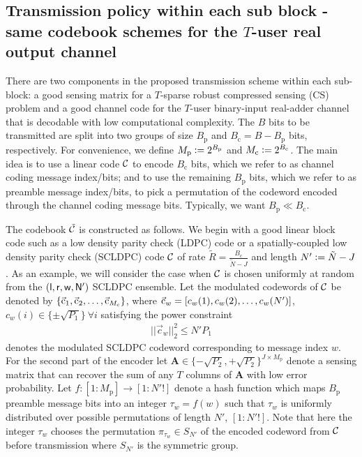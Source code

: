 \subsection{Transmission policy within each sub block - same codebook schemes for the $T$-user real output channel}
There are two components in the proposed transmission scheme within each sub-block: a good sensing matrix for a $T$-sparse robust compressed sensing (CS) problem and a good channel code for the $T$-user binary-input real-adder channel that is decodable with low computational complexity. The $B$ bits to be transmitted are split into two groups of size $B_{\mathrm{p}}$ and $B_{\mathrm{c}} = B-B_{\mathrm{p}}$ bits, respectively. For convenience, we define $M_{\mathrm{p}} \mathrel{\mathop:}= 2^{B_{\mathrm{p}}}$ and $M_{\mathrm{c}} \mathrel{\mathop:}= 2^{B_{\mathrm{c}}}$. The main idea is to use a linear code $\mathcal{C}$ to encode $B_{\mathrm{c}}$ bits, which we refer to as channel coding message index/bits; and to use the remaining $B_{\mathrm{p}}$ bits, which we refer to as preamble message index/bits, to pick a permutation of the codeword encoded through the channel coding message bits. Typically, we want $B_{\mathrm{p}} \ll B_{\mathrm{c}}$.

The codebook $\tilde{\mathcal{C}}$ is constructed as follows. We begin with a good linear block code such as a low density parity check (LDPC) code or a spatially-coupled low density parity check (SCLDPC) code $\mathcal{C}$ of rate $\tilde{R}=\frac{B_\mathrm{c}}{\tilde{N}-J}$ and length $N'\mathrel{\mathop:}= \tilde{N}-J$. As an example, we will consider the case when $\mathcal{C}$ is chosen uniformly at random from the $(\sf{l,r,w},N')$ SCLDPC ensemble\cite{kudekar2011threshold}. Let the modulated codewords of ${\mathcal{C}}$ be denoted by $\{\vec{\mathrm{c}}_1,\vec{\mathrm{c}}_2,\ldots,\vec{\mathrm{c}}_{M_\mathrm{c}} \}$, where $\vec{\mathrm{c}}_{w} = [c_{w}(1),c_{w}(2),\ldots,c_{w}(N')]$,  $c_{w}(i)\in\{\pm\sqrt{P_1}\}~\forall i$ satisfying the power constraint
\begin{align}
||\vec{c}_w||_2^2\leq N'P_1
\label{eqn:mac_powerconstraint}
\end{align}
denotes the modulated SCLDPC codeword corresponding to message index $w$. For the second part of the encoder let $\mathbf{A}\in\{-\sqrt{P_2},+\sqrt{P_2}\}^{J\times M_\mathrm{p}}$ denote a sensing matrix that can recover the sum of any $T$ columns of $\mathbf{A}$ with low error probability. Let $f:[1:M_\mathrm{p}] \rightarrow [1:N'!]$ denote a hash function which maps $B_\mathrm{p}$  preamble message bits into an integer $\tau_w = f(w)$ such that $\tau_w$ is uniformly distributed over possible permutations of length $N'$, $[1:N'!]$. Note that here the integer $\tau_w$ chooses the permutation $\pi_{\tau_w}\in S_{N'}$ of the encoded codeword from $\mathcal{C}$ before transmission where $S_{N'}$ is the symmetric group.

